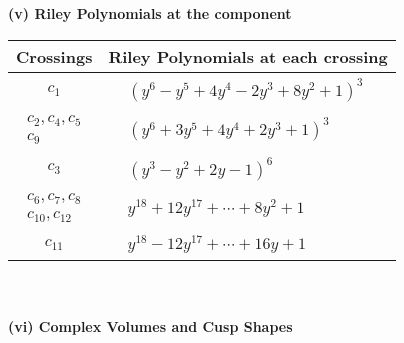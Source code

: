 \documentclass[1p]{elsarticle_modified}
\theoremstyle{definition}
\begin{document}
\flushleft \textbf{(v) Riley Polynomials at the component}\newline \\
\begin{tabular}{m{50pt}|m{274pt}}
Crossings & \hspace{64pt}Riley Polynomials at each crossing \\
\hline $$\begin{aligned}c_{1}\end{aligned}$$&$\begin{aligned}
&(y^6- y^5+4 y^4-2 y^3+8 y^2+1)^3
\end{aligned}$\\
\hline $$\begin{aligned}c_{2},c_{4},c_{5}\\c_{9}\end{aligned}$$&$\begin{aligned}
&(y^6+3 y^5+4 y^4+2 y^3+1)^3
\end{aligned}$\\
\hline $$\begin{aligned}c_{3}\end{aligned}$$&$\begin{aligned}
&(y^3- y^2+2 y-1)^6
\end{aligned}$\\
\hline $$\begin{aligned}c_{6},c_{7},c_{8}\\c_{10},c_{12}\end{aligned}$$&$\begin{aligned}
&y^{18}+12 y^{17}+\cdots+8 y^2+1
\end{aligned}$\\
\hline $$\begin{aligned}c_{11}\end{aligned}$$&$\begin{aligned}
&y^{18}-12 y^{17}+\cdots+16 y+1
\end{aligned}$\\
\hline
\end{tabular}\\~\\
\newpage\flushleft \textbf{(vi) Complex Volumes and Cusp Shapes}
\end{document}

